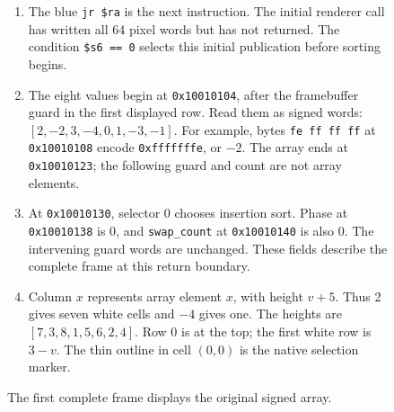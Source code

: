 \begin{figure}[htbp]
  \par\smallskip
  \begin{minipage}{\linewidth}
    \small
    \begin{enumerate}
      \item The blue \texttt{jr \$ra} is the next instruction. The initial renderer call has written all 64 pixel words but has not returned. The condition \texttt{\$s6 == 0} selects this initial publication before sorting begins.
      \item The eight values begin at \texttt{0x10010104}, after the framebuffer guard in the first displayed row. Read them as signed words: $[2,-2,3,-4,0,1,-3,-1]$. For example, bytes \texttt{fe ff ff ff} at \texttt{0x10010108} encode \texttt{0xfffffffe}, or $-2$. The array ends at \texttt{0x10010123}; the following guard and count are not array elements.
      \item At \texttt{0x10010130}, selector 0 chooses insertion sort. Phase at \texttt{0x10010138} is 0, and \texttt{swap\_count} at \texttt{0x10010140} is also 0. The intervening guard words are unchanged. These fields describe the complete frame at this return boundary.
      \item Column $x$ represents array element $x$, with height $v+5$. Thus 2 gives seven white cells and $-4$ gives one. The heights are $[7,3,8,1,5,6,2,4]$. Row 0 is at the top; the first white row is $3-v$. The thin outline in cell $(0,0)$ is the native selection marker.
    \end{enumerate}
  \end{minipage}
  \caption{The first complete frame displays the original signed array.}
  \label{capture:009-sorting-visualizer-f01-initial}
\end{figure}
\par
